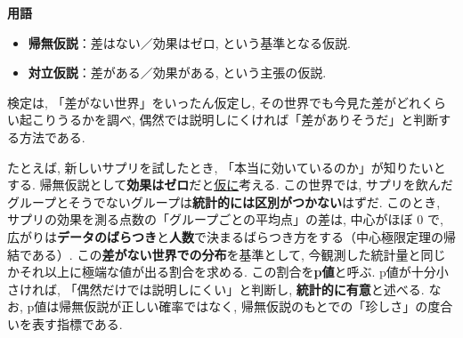     \noindent\textbf{用語}
    \begin{itemize}
      \item \textbf{帰無仮説}：差はない／効果はゼロ, という基準となる仮説.
      \item \textbf{対立仮説}：差がある／効果がある, という主張の仮説.
    \end{itemize}

 検定は, 「差がない世界」をいったん仮定し, その世界でも今見た差がどれくらい起こりうるかを調べ, 偶然では説明しにくければ「差がありそうだ」と判断する方法である.

  たとえば, 新しいサプリを試したとき, 「本当に効いているのか」が知りたいとする.
  帰無仮説として\textbf{効果はゼロ}だと\underline{仮に}考える.
  この世界では, サプリを飲んだグループとそうでないグループは\textbf{統計的には区別がつかない}はずだ.
  このとき, サプリの効果を測る点数の「グループごとの平均点」の差は, 中心がほぼ $0$ で, 広がりは\textbf{データのばらつき}と\textbf{人数}で決まるばらつき方をする（中心極限定理の帰結である）.
  この\textbf{差がない世界での分布}を基準として, 今観測した統計量と同じかそれ以上に極端な値が出る割合を求める.
  この割合を\textbf{p値}と呼ぶ.
  p値が十分小さければ, 「偶然だけでは説明しにくい」と判断し, \textbf{統計的に有意}と述べる. なお, p値は帰無仮説が正しい確率ではなく, 帰無仮説のもとでの「珍しさ」の度合いを表す指標である.

